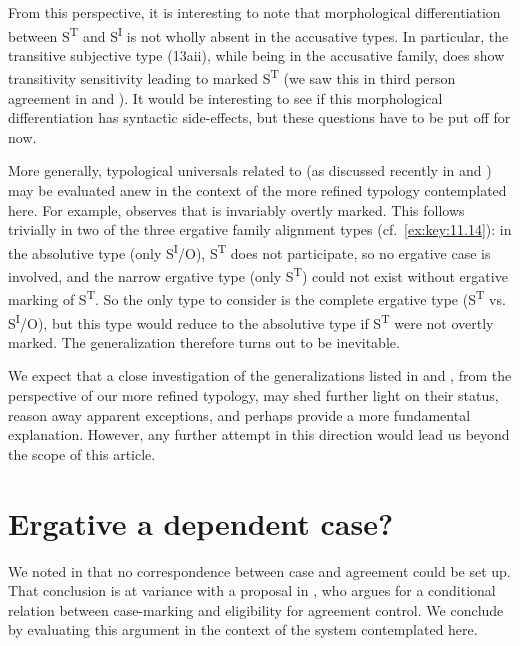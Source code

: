 \documentclass[output=paper]{langsci/langscibook}
\begin{document}
From this perspective, it is interesting to note that morphological
differentiation between S\textsuperscript{T} and S\textsuperscript{I} is not
wholly absent in the accusative  types. In particular, the
transitive subjective type (13aii), while being in the accusative family, does
show transitivity sensitivity leading to marked S\textsuperscript{T} (we saw
this in third person agreement in  and ). It would be
interesting to see if this morphological differentiation has syntactic
side-effects, but these questions have to be put off for now.

More generally, typological universals related to  (as discussed
recently in \citealt{Sheehan2014} and \citealt{Deal2015}) may be evaluated anew
in the context of the more refined  typology contemplated here. For
example, \citet[668]{Deal2015} observes that  is invariably
overtly marked. This follows trivially in two of the three ergative family
alignment types (cf.\ \eqref{ex:key:11.14}): in the absolutive type (only
S\textsuperscript{I}/O), S\textsuperscript{T} does not participate, so no
ergative case is involved, and the narrow ergative type (only
S\textsuperscript{T}) could not exist without ergative marking of
S\textsuperscript{T}. So the only type to consider is the complete ergative
type (S\textsuperscript{T} vs. S\textsuperscript{I}/O), but this type would
reduce to the absolutive type if S\textsuperscript{T} were not overtly marked.
The generalization therefore turns out to be inevitable.

We expect that a close investigation of the  generalizations listed
in \citet{Sheehan2014} and \citet{Deal2015}, from the perspective of our more
refined typology, may shed further light on their status, reason away apparent
exceptions, and perhaps provide a more fundamental explanation. However, any
further attempt in this direction would lead us beyond the scope of this
article.

\section{Ergative a dependent case?}\label{sec:key:11.6}

We noted in  that no correspondence between case and
agreement  could be set up. That conclusion is at variance with a
proposal in \citet{Bobaljik2008}, who argues for a conditional relation between
case-marking and eligibility for agreement control. We conclude by evaluating
this argument in the context of the system contemplated here.
\end{document}
